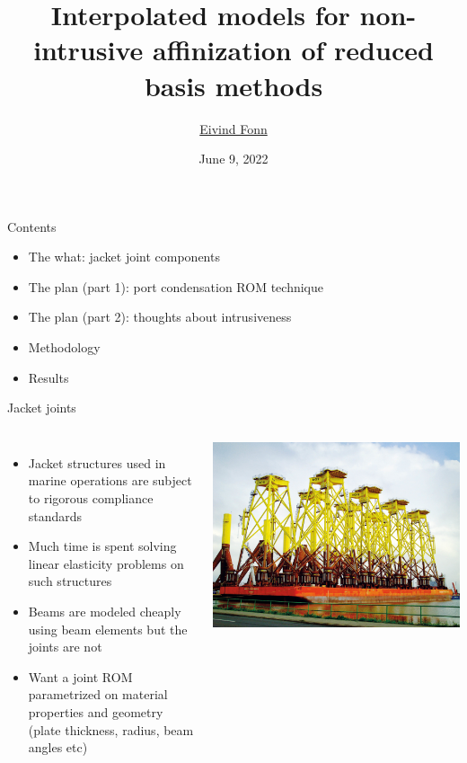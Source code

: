 \documentclass{sintefbeamer}
\title{Interpolated models for non-intrusive affinization of reduced basis methods}
\author{\href{mailto:eivind.fonn@sintef.no}{Eivind Fonn}}
\date{June 9, 2022}
\begin{document}
\maketitle

\begin{frame}{Contents}
    \begin{itemize}
        \item The what: jacket joint components
        \item The plan (part 1): port condensation ROM technique
        \item The plan (part 2): thoughts about intrusiveness
        \item Methodology
        \item Results
    \end{itemize}
\end{frame}

\begin{frame}{Jacket joints}
    \begin{columns}
        \begin{itemize}
            \item Jacket structures used in marine operations are subject to rigorous compliance standards
            \item Much time is spent solving linear elasticity problems on such structures
            \item Beams are modeled cheaply using beam elements but the joints are not
            \item Want a joint ROM parametrized on material properties and geometry (plate thickness, radius, beam angles etc)
        \end{itemize}
        \includegraphics[height=0.7\textheight,trim={12cm 15cm 40cm 0},clip]{images/jacket.jpg}
    \end{columns}
\end{frame}
\end{document}

